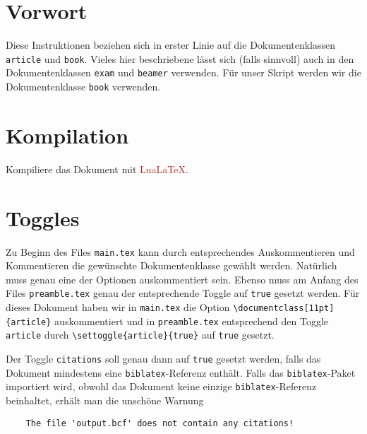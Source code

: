 
\section{Vorwort}
Diese Instruktionen beziehen sich in erster Linie auf die Dokumentenklassen \verb|article| und \verb|book|. Vieles hier beschriebene lässt sich (falls sinnvoll) auch in den Dokumentenklassen \verb|exam| und \verb|beamer| verwenden. Für unser Skript werden wir die Dokumentenklasse \verb|book| verwenden.

\section{Kompilation}
Kompiliere das Dokument mit \textcolor{FireBrick}{Lua\LaTeX}.

\section{Toggles}
Zu Beginn des Files \verb|main.tex| kann durch entsprechendes Auskommentieren und Kommentieren die gewünschte Dokumentenklasse gewählt werden. Natürlich muss genau eine der Optionen auskommentiert sein. Ebenso muss am Anfang des Files \verb|preamble.tex| genau der entsprechende Toggle auf \verb|true| gesetzt werden. Für dieses Dokument haben wir in \verb|main.tex| die Option \texttt{\textbackslash}\verb|documentclass[11pt]{article}|
auskommentiert und in \verb|preamble.tex| entsprechend den Toggle \verb|article| durch \verb|\settoggle{article}{true}|
auf \verb|true| gesetzt.

Der Toggle \verb|citations| soll genau dann auf \verb|true| gesetzt werden, falls das Dokument mindestens eine \verb|biblatex|-Referenz enthält. Falls das \verb|biblatex|-Paket importiert wird, obwohl das Dokument keine einzige \verb|biblatex|-Referenz beinhaltet, erhält man die unschöne Warnung
\begin{verbatim}
    The file 'output.bcf' does not contain any citations!
\end{verbatim}

